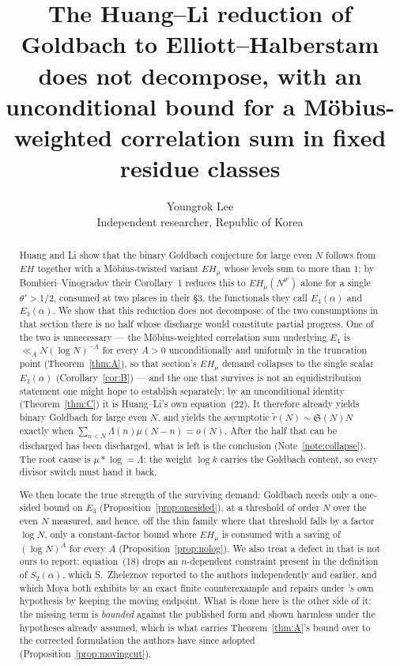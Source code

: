 \documentclass[11pt,a4paper]{article}
\title{The Huang--Li reduction of Goldbach to Elliott--Halberstam does
not decompose, with an unconditional bound for a M\"obius-weighted
correlation sum in fixed residue classes}
\author{Youngrok Lee\\
\small Independent researcher, Republic of Korea}
\date{}
\theoremstyle{plain}
\theoremstyle{definition}
\theoremstyle{remark}
\renewcommand{\SS}{\mathfrak{S}}
\begin{document}
\maketitle

\begin{abstract}
Huang and Li \cite{HL} show that the binary Goldbach conjecture for
large even $N$ follows from $EH$ together with a M\"obius-twisted
variant $EH_\mu$ whose levels sum to more than $1$; by
Bombieri--Vinogradov their Corollary~1 reduces this to
$EH_\mu(N^{\theta'})$ alone for a single $\theta'>1/2$, consumed at
two places in their \S3, the functionals they call $E_4(\alpha)$ and
$E_3(\alpha)$. We show that this reduction does not
decompose: of the two consumptions in that section there is no half
whose discharge would constitute partial progress. One of the two is
unnecessary --- the M\"obius-weighted correlation sum underlying $E_4$
is $\ll_A N(\log N)^{-A}$ for every $A>0$ unconditionally and uniformly
in the truncation point (Theorem~\ref{thm:A}), so that section's
$EH_\mu$ demand collapses to the single scalar $E_3(\alpha)$
(Corollary~\ref{cor:B}) --- and the one that survives is not an
equidistribution statement one might hope to establish separately: by
an unconditional identity (Theorem~\ref{thm:C}) it is Huang--Li's own
equation~(22). It therefore already yields binary Goldbach for large
even $N$, and yields the asymptotic $\tilde r(N)\sim\SS(N)N$ exactly
when $\sum_{n<N}\Lambda(n)\mu(N-n)=o(N)$. After the half that can be
discharged has been discharged, what is left is the conclusion
(Note~\ref{note:collapse}). The root cause is $\mu*\log=\Lambda$: the
weight $\log k$ carries the Goldbach content, so every divisor switch
must hand it back.

We then locate the true strength of the surviving demand: Goldbach
needs only a one-sided bound on $E_3$
(Proposition~\ref{prop:onesided}), at a threshold of order $N$ over the
even $N$ measured, and hence, off the thin family where that threshold
falls by a factor $\log N$, only a constant-factor bound where
$EH_\mu$ is consumed with a saving of $(\log N)^A$ for every $A$
(Proposition~\ref{prop:nolog}). We also treat a defect in \cite{HL}
that is not ours to report: equation~(18) drops an $n$-dependent
constraint present in the definition of $S_2(\alpha)$, which
S.~Zheleznov reported to the authors independently and earlier, and
which Moya \cite{Moya} both exhibits by an exact finite counterexample
and repairs under \cite{HL}'s own hypothesis by keeping the moving
endpoint. What is done here is the other side of it: the missing term
is \emph{bounded} against the published form and shown harmless under
the hypotheses already assumed, which is what carries
Theorem~\ref{thm:A}'s bound over to the corrected formulation the
authors have since adopted (Proposition~\ref{prop:movingcut}).


\end{abstract}
\end{document}
